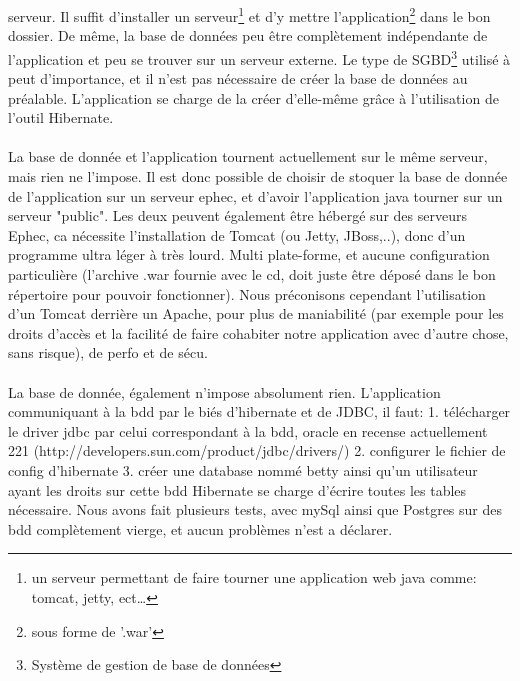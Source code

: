 serveur. Il suffit d'installer un serveur\footnote{un serveur permettant
de faire tourner une application web java comme: tomcat, jetty, ect…} et d'y
mettre l'application\footnote{sous forme de '.war'} dans le bon dossier.
De même, la base de données peu être complètement indépendante de l'application
et peu se trouver sur un serveur externe.
Le type de SGBD\footnote{Système de gestion de base de données} utilisé à peut d'importance, et il n'est pas nécessaire de créer
la base de données au préalable. L'application se charge de la créer d'elle-même
grâce à l'utilisation de l'outil Hibernate.\\
\\
La base de donnée et l'application tournent actuellement sur le même serveur, mais rien ne l'impose.
Il est donc possible de choisir de stoquer la base de donnée de l'application sur un serveur ephec, et d'avoir l'application java tourner sur un serveur "public".
Les deux peuvent également être hébergé sur des serveurs Ephec, ca nécessite l'installation de Tomcat (ou Jetty, JBoss,..), donc d'un programme ultra léger à très lourd. Multi plate-forme, et aucune configuration particulière (l'archive .war fournie avec le cd, doit juste être déposé dans le bon répertoire pour pouvoir fonctionner).
Nous préconisons cependant l'utilisation d'un Tomcat derrière un Apache, pour plus de maniabilité (par exemple pour les droits d'accès et la facilité de faire cohabiter notre application avec d'autre chose, sans risque), de perfo et de sécu. \\
\\
La base de donnée, également n'impose absolument rien. L'application communiquant à la bdd par le biés d'hibernate et de JDBC, il faut:
1. télécharger le driver jdbc par celui correspondant à la bdd, oracle en recense actuellement 221 (http://developers.sun.com/product/jdbc/drivers/)
2. configurer le fichier de config d'hibernate
3. créer une database nommé betty ainsi qu'un utilisateur ayant les droits sur cette bdd 
Hibernate se charge d'écrire toutes les tables nécessaire.  Nous avons fait plusieurs tests, avec mySql ainsi que Postgres sur des bdd complètement vierge, et aucun problèmes n'est a déclarer.




